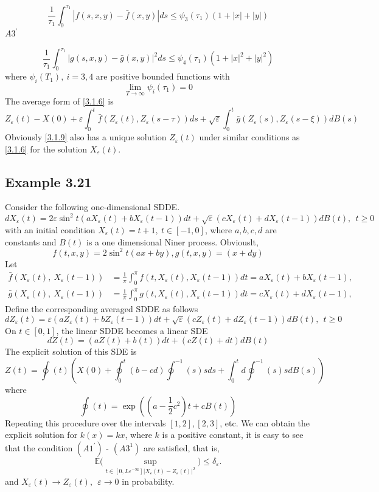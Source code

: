 \documentclass[a4 paper, 12pt]{report}
\theoremstyle{plain}
\begin{document}
\begin{equation}\label{3.1.7}
\frac{1}{\tau_1}\int_0^{\tau_1}|f(s,x,y) - \bar{f}(x,y)|ds\leq \psi_3(\tau_1)(1+|x|+|y|)
\end{equation}
$A3^\prime$

\begin{equation}\label{3.1.8}
\frac{1}{\tau_1}\int_0^{\tau_1}|g(s,x,y) - \bar{g}(x,y)|^2ds\leq \psi_4(\tau_1)(1+|x|^2+|y|^2)
\end{equation}
where $\psi_i(T_1),~i = 3,4$ are positive bounded functions with 
$$
\lim_{T\rightarrow \infty}\psi_i(\tau_1)   = 0
$$
The average form of \eqref{3.1.6} is 
\begin{equation}\label{3.1.9}
Z_\varepsilon(t) - X(0)+\varepsilon\int_0^t\bar{f}(Z_\varepsilon(t),Z_\varepsilon(s-\tau))ds+\sqrt{\varepsilon}\int_0^t\bar{g}(Z_\varepsilon(s),Z_\varepsilon(s-\xi))dB(s)
\end{equation}
Obviously \eqref{3.1.9} also has a unique solution $Z_\varepsilon(t)$ under similar conditions as \eqref{3.1.6} for the solution $X_\varepsilon(t)$.\\
\subsection*{Example 3.21}
Consider the following one-dimensional SDDE.
$$
dX_\varepsilon(t) = 2\varepsilon\sin^2t(aX_\varepsilon(t)+bX_\varepsilon(t-1))dt+\sqrt{\varepsilon}(cX_\varepsilon(t)+dX_\varepsilon(t-1))dB(t),~~t\geq 0
$$
with an initial condition $X_\varepsilon(t) = t+1,~t\in[-1,0]$, where $a,b,c,d$ are constants and $B(t)$ is a one dimensional Niner process. Obviouslt,
$$
f(t,x,y) = 2\sin^2t(ax+by),g(t,x,y) = (x+dy)
$$
Let 
\begin{align*}
\bar{f}(X_\varepsilon(t),~X_\varepsilon(t-1)) & = \frac{1}{\pi}\int_0^\pi f(t,X_\varepsilon(t),X_\varepsilon(t-1))dt = aX_\varepsilon(t)+bX_\varepsilon(t-1),\\
\bar{g}(X_\varepsilon(t),~X_\varepsilon(t-1)) & = \frac{1}{\pi}\int_0^\pi g(t,X_\varepsilon(t),X_\varepsilon(t-1))dt = cX_\varepsilon(t)+dX_\varepsilon(t-1),
\end{align*}
Define the corresponding averaged SDDE as follows
$$
dZ_\varepsilon(t) = \varepsilon(aZ_\varepsilon(t)+bZ_\varepsilon(t-1))dt+\sqrt{\varepsilon}(cZ_\varepsilon(t)+dZ_\varepsilon(t-1))dB(t),~~t\geq 0
$$
On $t\in[0,1]$, the linear SDDE becomes a linear SDE
$$
dZ(t) = (aZ(t)+b(t))dt+(cZ(t)+dt)dB(t)
$$
The explicit solution of this SDE is 
$$
Z(t) = \oint(t)(X(0)+\oint_0^t(b-cd)\oint^{-1}(s)sds+\int_0^td\oint^{-1}(s)sdB(s))
$$
where 
$$
\oint(t) = \exp((a-\frac{1}{2}c^2)t+cB(t))
$$
Repeating this procedure over the intervals $[1,2],[2,3]$, etc. We can obtain the explicit solution for $k(x) = kx$, where $k$ is a positive constant, it is easy to see that the condition $(A1^\prime)$ - $(A3^1)$  are satisfied, that is,
$$
\mathbb{E}\bigg(\sup_{t\in[0,L\varepsilon^{-\infty}]|X_\varepsilon(t)-Z_\varepsilon(t)|^2}\bigg)\leq \delta_\varepsilon.
$$
and $X_\varepsilon(t)\rightarrow Z_\varepsilon(t),~~\varepsilon\rightarrow 0$ in probability.
\end{document}
